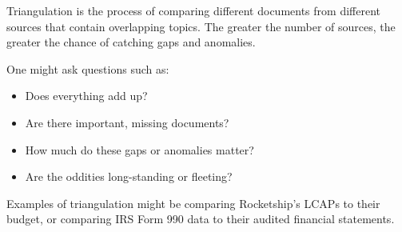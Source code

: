 Triangulation is the process of comparing different documents from different sources that contain overlapping topics. The greater the number of sources, the greater the chance of catching gaps and anomalies.

One might ask questions such as:
\begin{itemize}
  \item Does everything add up? 
  \item Are there important, missing documents? 
  \item How much do these gaps or anomalies matter? 
  \item Are the oddities long-standing or fleeting? 
\end{itemize}
Examples of triangulation might be comparing Rocketship's LCAPs to their budget, or comparing IRS Form 990 data to their audited financial statements.


